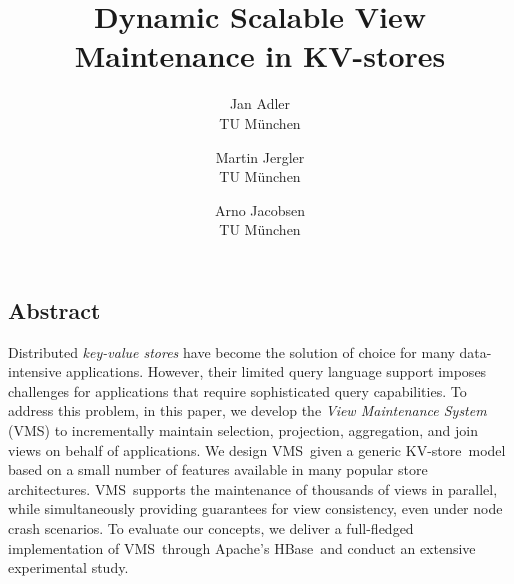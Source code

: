 \documentclass[letterpaper,twocolumn,10pt]{article}
\newcommand{\KVS}{{\small \textsf{KV-store}}}
\newcommand{\HB}{{\small \textsf{HBase}}}
\newcommand{\VMS}{{\small \textsf{VMS}}}
\begin{document}
\let\footnote=\endnote
\date{}

\title{\Large \bf Dynamic Scalable View Maintenance in KV-stores}

\author{
{\rm Jan Adler}\\
TU M\"unchen
\and
{\rm Martin Jergler}\\
TU M\"unchen
\and
{\rm Arno Jacobsen}\\
TU M\"unchen
} %

\maketitle

\thispagestyle{empty}


\subsection*{Abstract}
Distributed \textit{key-value stores} have become the solution of
choice for many data-intensive applications. However, their limited
query language support imposes challenges for applications that
require sophisticated query capabilities.  To address this problem, in
this paper, we develop the \textit{View Maintenance System} (\VMS) to
incrementally maintain selection, projection, aggregation, and join
views on behalf of applications.  We design \VMS\ given a generic
\KVS\ model based on a small number of features available in many
popular store architectures.  \VMS\ supports the maintenance of
thousands of views in parallel, while simultaneously providing
guarantees for view consistency, even under node crash scenarios.  To
evaluate our concepts, we deliver a full-fledged implementation of
\VMS\ through Apache's \HB\ and conduct an extensive experimental
study.








%


\end{document}

